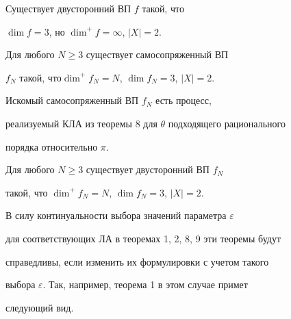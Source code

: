 \begin{cor}


Существует двусторонний ВП $f$ такой, что


$\dim f=3$, но $\dim^+f=\infty$, $|X|=2$.


\end{cor}





\begin{thm}


Для любого $N\ge3$ существует самосопряженный ВП


$f_N$ такой, что\linebreak $\dim^+f_N=N$, $\dim f_N=3$, $|X|=2$.


\end{thm}





\begin{pf}


Искомый самосопряженный ВП $f_N$ есть процесс, 


реализуемый КЛА из теоремы 8 для $\theta$ подходящего рационального 


порядка относительно $\pi$.


\end{pf}





\begin{cor}


Для любого $N\ge3$ существует двусторонний ВП $f_N$


такой, что $\dim^+f_N=N$, $\dim f_N=3$, $|X|=2$.


\end{cor}





\begin{note}


В силу континуальности выбора значений параметра $\varepsilon$


для соответствующих ЛА в теоремах 1, 2, 8, 9 эти теоремы будут 


справедливы, если изменить их формулировки с учетом такого


выбора $\varepsilon$. Так, например, теорема 1 в этом случае примет 


следующий вид.


\end{note}





